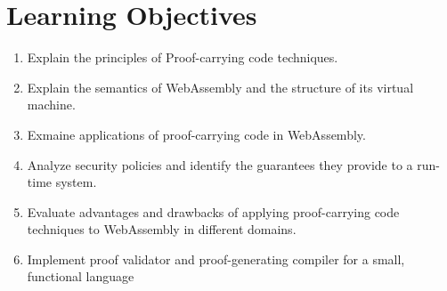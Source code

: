 \documentclass[11pt,a4paper,titlepage]{article}
\begin{document}

\section*{Learning Objectives}
\begin{enumerate}
    \item
        Explain the principles of Proof-carrying code techniques.
    \item
        Explain the semantics of WebAssembly and the structure of its virtual machine.
    \item
        Exmaine applications of proof-carrying code in WebAssembly.
    \item
        Analyze security policies and identify the guarantees they provide to a run-time system.
    \item
        Evaluate advantages and drawbacks of applying proof-carrying code techniques to WebAssembly in different domains.
    \item
        Implement proof validator and proof-generating compiler for a small, functional language
\end{enumerate}
\end{document}

